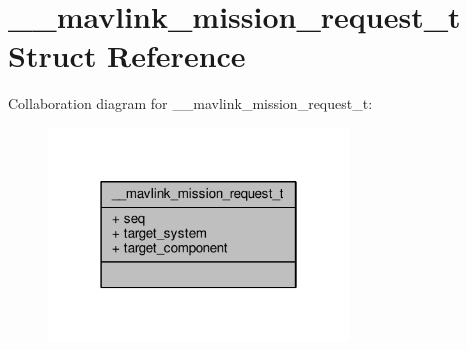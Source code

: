 \hypertarget{struct____mavlink__mission__request__t}{\section{\+\_\+\+\_\+mavlink\+\_\+mission\+\_\+request\+\_\+t Struct Reference}
\label{struct____mavlink__mission__request__t}
}


Collaboration diagram for \+\_\+\+\_\+mavlink\+\_\+mission\+\_\+request\+\_\+t\+:
\nopagebreak
\begin{figure}[H]
\begin{center}
\leavevmode
\includegraphics[width=226pt]{struct____mavlink__mission__request__t__coll__graph}
\end{center}
\end{figure}
